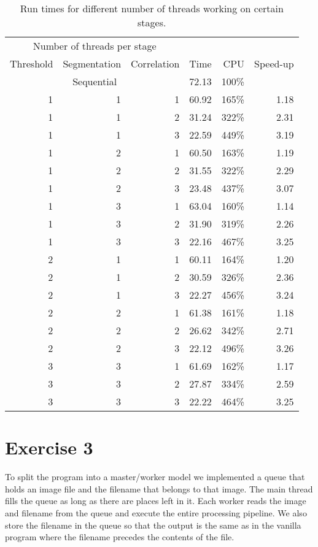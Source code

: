 \documentclass[a4paper]{article}
\begin{document}
\begin{table}[t]
	\centering
	\label{tbl:ex2}
	\caption{Run times for different number of threads working on certain stages.}
	\begin{tabular}{r|r|r|r|r|r}
		\multicolumn{3}{c|}{Number of threads per stage} & \multicolumn{2}{c}{}\\
		Threshold & Segmentation & Correlation & Time & CPU & Speed-up \\ \hline
		\multicolumn{3}{c|}{Sequential} & 72.13 & 100\% & \\ \cline{1-3}
		1 & 1 & 1 & 60.92 & 165\% & 1.18 \\
		1 & 1 & 2 & 31.24 & 322\% & 2.31 \\
		1 & 1 & 3 & 22.59 & 449\% & 3.19 \\
		1 & 2 & 1 & 60.50 & 163\% & 1.19 \\
		1 & 2 & 2 & 31.55 & 322\% & 2.29 \\
		1 & 2 & 3 & 23.48 & 437\% & 3.07 \\
		1 & 3 & 1 & 63.04 & 160\% & 1.14 \\
		1 & 3 & 2 & 31.90 & 319\% & 2.26 \\
		1 & 3 & 3 & 22.16 & 467\% & 3.25 \\
		2 & 1 & 1 & 60.11 & 164\% & 1.20 \\
		2 & 1 & 2 & 30.59 & 326\% & 2.36 \\
		2 & 1 & 3 & 22.27 & 456\% & 3.24 \\
		2 & 2 & 1 & 61.38 & 161\% & 1.18 \\
		2 & 2 & 2 & 26.62 & 342\% & 2.71 \\
		2 & 2 & 3 & 22.12 & 496\% & 3.26 \\
		3 & 3 & 1 & 61.69 & 162\% & 1.17 \\
		3 & 3 & 2 & 27.87 & 334\% & 2.59 \\
		3 & 3 & 3 & 22.22 & 464\% & 3.25 \\
	\end{tabular}
\end{table}

\section{Exercise 3}

To split the program into a master/worker model we implemented a queue that holds an image file and the filename that belongs to that image. The main thread fills the queue as long as there are places left in it. Each worker reads the image and filename from the queue and execute the entire processing pipeline. We also store the filename in the queue so that the output is the same as in the vanilla program where the filename precedes the contents of the file.
\end{document}
